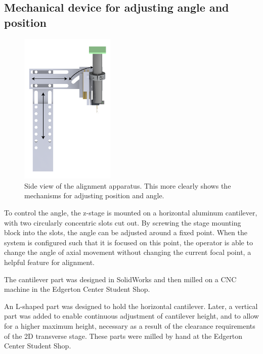 \subsection{Mechanical device for adjusting angle and position}

\begin{figure}[h!]
\centering
\includegraphics[width=0.4\textwidth]{Images/System/angle_a.png}
\caption[Side view of the alignment apparatus.]{Side view of the alignment apparatus. This more clearly shows the mechanisms for adjusting position and angle.}
\end{figure}

To control the angle, the z-stage is mounted on a horizontal aluminum cantilever, with two circularly concentric slots cut out. By screwing the stage mounting block into the slots, the angle can be adjusted around a fixed point. When the system is configured such that it is focused on this point, the operator is able to change the angle of axial movement without changing the current focal point, a helpful feature for alignment.


The cantilever part was designed in SolidWorks and then milled on a CNC machine in the Edgerton Center Student Shop.

An L-shaped part was designed to hold the horizontal cantilever. Later, a vertical part was added to enable continuous adjustment of cantilever height, and to allow for a higher maximum height, necessary as a result of the clearance requirements of the 2D transverse stage. These parts were milled by hand at the Edgerton Center Student Shop.

